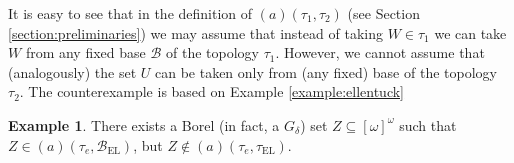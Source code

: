 \documentclass[12pt]{amsart}
\theoremstyle{plain}
\theoremstyle{definition}
\newtheorem{example}[theorem]{Example}
\theoremstyle{remark}
\newcommand{\infsub}{[\omega]^{\omega}}
\newcommand{\cB}{{\mathcal B}}
\newcommand{\aideal}{\mathit{(a)}}
\newcommand{\tauEllentuck}{\tau_{\mathrm{EL}}}
\newcommand{\baseEllentuck}{\cB_{\mathrm{EL}}}
\begin{document}
It is easy to see that in the definition of $\aideal(\tau_1, \tau_2)$
(see Section \ref{section:preliminaries})
we may assume that instead of taking $W \in \tau_1$
we can take $W$ from any fixed base $\cB$ of the topology
$\tau_1$. However, we cannot assume that (analogously)
the set $U$ can be taken only from (any fixed) base of
the topology $\tau_2$. The counterexample is based 
on Example \ref{example:ellentuck}

\begin{example}
There exists a Borel (in fact,
a $G_{\delta}$) %
set $Z \subseteq \infsub$ such that 
$Z \in \aideal(\tau_e, \baseEllentuck)$, but
$Z \not\in \aideal(\tau_e, \tauEllentuck)$.
\end{example}
\end{document}
